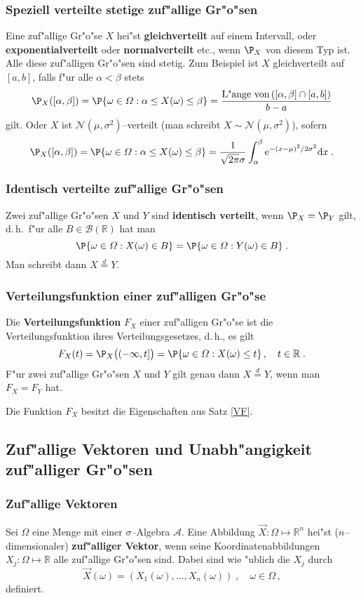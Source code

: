 \documentclass[ngerman,draft,parskip=half,twoside]{scrartcl}
\newcommand*{\R}{\mathbb{R}}      %
\newcommand*{\Algeb}{\mathcal{A}}   %
\newcommand*{\BorelM}{\mathcal{B}}  %
\begin{document}
\subsubsection{Speziell verteilte stetige zuf"allige Gr"o"sen}
Eine zuf"allige Gr"o"se $X$ hei"st \textbf{gleichverteilt} auf einem Intervall,
oder \textbf{exponentialverteilt} oder \textbf{normalverteilt} etc., wenn $\P_X$ von diesem Typ
ist.
Alle diese zuf"alligen Gr"o"sen sind stetig.
Zum Beispiel ist $X$ gleichverteilt auf $[a,b]$, falls f"ur alle $\alpha<\beta$
stets
$$
\P_X([\alpha,\beta])=\P\{\omega\in \Omega : \alpha\le X(\omega)\le \beta\}
=\frac{\mbox{L"ange von}\, ([\alpha,\beta]\cap[a,b])}{b-a}
$$
gilt. Oder $X$ ist $\mathcal N(\mu,\sigma^2)$--verteilt (man schreibt $X\sim \mathcal N(\mu,\sigma^2)$),
sofern
$$
\P_X([\alpha,\beta])=\P\{\omega\in \Omega : \alpha\le X(\omega)\le \beta\}=
\frac{1}{\sqrt{2\pi}\sigma}\int_\alpha^\beta \mathrm e^{-(x-\mu)^2/2\sigma^2}\mathrm d x\;.
$$
\subsubsection{Identisch verteilte zuf"allige Gr"o"sen}
Zwei zuf"allige Gr"o"sen $X$ und $Y$ sind \textbf{identisch verteilt}, wenn $\P_X=\P_Y$ gilt,
d.\,h.~f"ur alle $B\in\BorelM(\R)$ hat man
$$
\P\{\omega\in \Omega : X(\omega)\in B\}= \P\{\omega\in \Omega : Y(\omega)\in B\}\;.
$$
Man schreibt dann $X\stackrel{d}{=}Y$.
\subsubsection{Verteilungsfunktion einer zuf"alligen Gr"o"se}
Die \textbf{Verteilungsfunktion} $F_X$ einer zuf"alligen Gr"o"se ist die Verteilungsfunktion
ihres Verteilungsgesetzes, d.\,h., es gilt
$$
F_X(t)=\P_X\big((-\infty,t]\big)=\P\{\omega\in\Omega : X(\omega)\le t\}\,,\quad t\in \R\;.
$$
F"ur zwei zuf"allige Gr"o"sen $X$ und $Y$ gilt genau dann $X\stackrel{d}{=}Y$, wenn man
$F_X=F_Y$ hat.

Die Funktion $F_X$ besitzt die Eigenschaften aus Satz \ref{VF}.

\subsection{Zuf"allige Vektoren und Unabh"angigkeit zuf"alliger Gr"o"sen}
\subsubsection{Zuf"allige Vektoren}
Sei $\Omega$ eine Menge mit einer $\sigma$--Algebra $\Algeb$. Eine Abbildung $\vec X \colon \Omega\mapsto\R^n$
hei"st ($n$--dimensionaler) \textbf{zuf"alliger Vektor}, wenn seine Koordinatenabbildungen
$X_j \colon\Omega\mapsto \R$ alle zuf"allige Gr"o"sen sind. Dabei sind wie "ublich die $X_j$ durch
$$
\vec X(\omega)=(X_1(\omega),\ldots,X_n(\omega))\;,\quad \omega\in\Omega\,,
$$
definiert.
\end{document}
